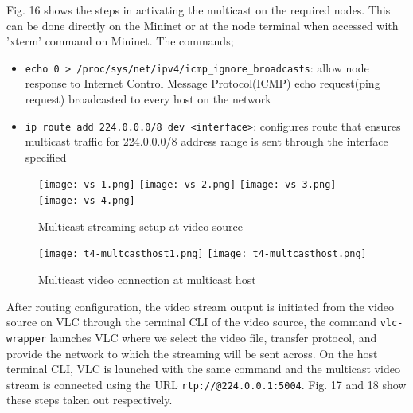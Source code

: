 \documentclass{article}
\begin{document}
\newpage
Fig. 16 shows the steps in activating the multicast on the required nodes. This can be done directly on the Mininet or at the node terminal when accessed with 'xterm' command on Mininet. The commands;
	\begin{itemize}
		\item \texttt{echo 0 > /proc/sys/net/ipv4/icmp\_ignore\_broadcasts}: allow node response to Internet Control Message Protocol(ICMP) echo request(ping request) broadcasted to every host on the network
		\item \texttt{ip route add 224.0.0.0/8 dev <interface>}: configures route that ensures multicast traffic for 224.0.0.0/8 address range is sent through the interface specified
	\end{itemize}
    	\begin{figure}[h]
		\centering
        		\texttt{[image: vs-1.png]}
        		\texttt{[image: vs-2.png]}
        		\texttt{[image: vs-3.png]}
        		\texttt{[image: vs-4.png]}
        		\caption{Multicast streaming setup at video source}
        		\label{fig:t4-2}
    	\end{figure}
	\begin{figure}[h]
		\centering
		\texttt{[image: t4-multcasthost1.png]}
		\texttt{[image: t4-multcasthost.png]}
		\caption{Multicast video connection at multicast host}
		\label{fig:t4-3}
	\end{figure}
After routing configuration, the video stream output is initiated from the video source on VLC through the terminal CLI of the video source, the command \texttt{vlc-wrapper} launches VLC where we select the video file, transfer protocol, and provide the network to which the streaming will be sent across. On the host terminal CLI, VLC is launched with the same command and the multicast video stream is connected using the URL \texttt{rtp://@224.0.0.1:5004}. Fig. 17 and 18 show these steps taken out respectively.
\end{document}
